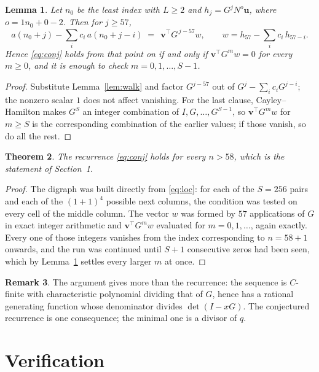 \documentclass[11pt,a4paper]{article}
\theoremstyle{plain}
\newtheorem{theorem}{Theorem}
\newtheorem{lemma}[theorem]{Lemma}
\theoremstyle{definition}
\newtheorem{remark}[theorem]{Remark}
\begin{document}
\begin{lemma}\label{lem:crit}
Let $n_0$ be the least index with $L\ge2$ and $h_j=G^{j}N^{o}\mathbf{u}$, where
$o=1n_0+0-2$. Then for $j\ge57$,
\[
a(n_0+j)-\sum_i c_i\,a(n_0+j-i)\;=\;\,\mathbf{v}^{\!\top}G^{\,j-57}w,
\qquad w=h_{57}-\sum_i c_i\,h_{57-i} .
\]
Hence \eqref{eq:conj} holds from that point on if and only if
$\mathbf{v}^{\!\top}G^{m}w=0$ for every $m\ge0$, and it is enough to check
$m=0,1,\dots,S-1$.
\end{lemma}

\begin{proof}
Substitute Lemma~\ref{lem:walk} and factor $G^{j-57}$ out of
$G^{j}-\sum_ic_iG^{j-i}$; the nonzero scalar $1$ does not affect
vanishing. For the last clause, Cayley--Hamilton makes $G^{S}$ an integer combination of
$I,G,\dots,G^{S-1}$, so $\mathbf{v}^{\!\top}G^{m}w$ for $m\ge S$ is the corresponding
combination of the earlier values; if those vanish, so do all the rest.
\end{proof}

\begin{theorem}
The recurrence \eqref{eq:conj} holds for every $n>58$, which is the statement of
Section~1.
\end{theorem}

\begin{proof}
The digraph was built directly from \eqref{eq:loc}: for each of the $S=256$ pairs and each
of the $(1+1)^{4}$ possible next columns, the condition was tested on every cell of
the middle column. The vector $w$ was formed by $57$ applications of $G$ in exact integer
arithmetic and $\mathbf{v}^{\!\top}G^{m}w$ evaluated for $m=0,1,\dots$, again exactly.
Every one of those integers vanishes from the index corresponding to $n=58+1$ onwards,
and the run was continued until $S+1$ consecutive zeros had been seen, which by
Lemma~\ref{lem:crit} settles every larger $m$ at once.
\end{proof}

\begin{remark}
The argument gives more than the recurrence: the sequence is $C$-finite with characteristic
polynomial dividing that of $G$, hence has a rational generating function whose denominator
divides $\det(I-xG)$. The conjectured recurrence is one consequence; the minimal one is a
divisor of $q$.
\end{remark}

\section{Verification}
\end{document}
